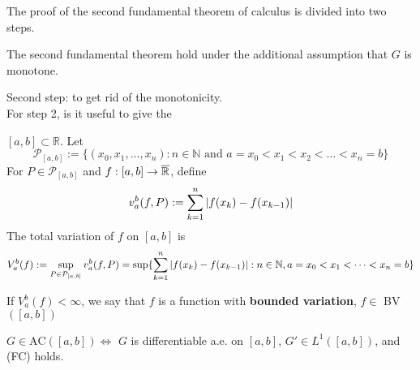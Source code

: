 The proof of the second fundamental theorem of calculus is divided into two steps. 
\begin{lemma}
    The second fundamental theorem hold under the additional assumption that \(G\) is monotone.
\end{lemma}
Second step: to get rid of the monotonicity. \\
For step 2, is it useful to give the
\begin{definition}
    \(\left[a, b\right] \subset \mathbb{R}\). Let 
    \[
        \mathcal{P}_{\left[a, b\right]} := \lbrace (x_0, x_1, \dots, x_n): n \in \mathbb{N} \text{ and } a=x_0 < x_1 < x_2 < \dots < x_n = b \rbrace
    \]
    For \(P \in \mathcal{P}_{\left[a, b\right]}\) and \(f: [a, b] \to \overline{\mathbb{R}}\), define
    \[
        v_a^b(f, P) := \sum_{k=1}^n \abs{f(x_k) - f(x_{k-1})}
    \]
    The total variation of \(f \) on \([a, b]\) is 
    \[
        V_a^b (f) := \sup_{P \in \mathcal{P}_{\left[a, b\right]}} v_a^b (f, P)
        = \sup \lbrace \sum_{k=1}^n \abs{f(x_k)-f(x_{k-1})}:n \in \mathbb{N}, a=x_0 < x_1 < \dots <x_n = b \rbrace
    \]
\end{definition}
If \(V_a^b(f) < \infty\), we say that \(f\) is a function with \textbf{bounded variation}, \(f \in \) BV \(([a, b])\)
\begin{theorem}
    \(G \in \mbox{AC}([a,b]) \Leftrightarrow\) \(G\) is differentiable a.e. on \([a,b]\), \(G' \in L^1([a,b])\), and (FC) holds.
\end{theorem}

